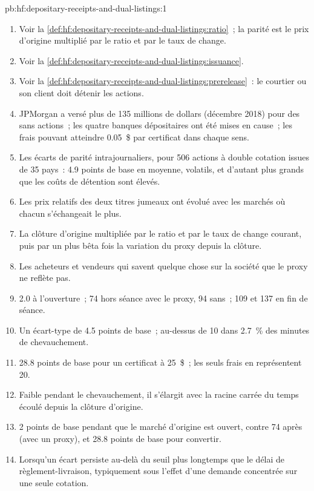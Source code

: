 \begin{solution}{pb:hf:depositary-receipts-and-dual-listings:1}
\begin{enumerate}
\item Voir la \cref{def:hf:depositary-receipts-and-dual-listings:ratio}~; la parité est le prix d'origine multiplié par le ratio et par le taux de change.
\item Voir la \cref{def:hf:depositary-receipts-and-dual-listings:issuance}.
\item Voir la \cref{def:hf:depositary-receipts-and-dual-listings:prerelease}~: le courtier ou son client doit détenir les actions.
\item JPMorgan a versé plus de 135 millions de dollars (décembre 2018) pour des  sans actions~; les quatre banques dépositaires ont été mises en cause~; les frais pouvant atteindre
0.05~\$ par certificat dans chaque sens.
\item Les écarts de parité intrajournaliers, pour 506 actions à double cotation issues de 35 pays~: 4.9 points de base en moyenne, volatils, et d'autant plus grands que les coûts de détention sont élevés.
\item Les prix relatifs des deux titres jumeaux ont évolué avec les marchés où chacun s'échangeait le plus.
\item La clôture d'origine multipliée par le ratio et par le taux de change courant, puis par un plus bêta fois la variation du proxy depuis la clôture.
\item Les acheteurs et vendeurs qui savent quelque chose sur la société que le proxy ne reflète pas.
\item 2.0 à l'ouverture~; 74 hors séance avec le proxy, 94 sans~; 109 et 137 en fin de séance.
\item Un écart-type de 4.5 points de base~; au-dessus de 10 dans 2.7~\% des minutes de chevauchement.
\item 28.8 points de base pour un certificat à 25~\$~; les seuls frais en représentent 20.
\item Faible pendant le chevauchement, il s'élargit avec la racine carrée du temps écoulé depuis la clôture d'origine.
\item 2 points de base pendant que le marché d'origine est ouvert, contre 74 après (avec un proxy), et 28.8 points de base pour convertir.
\item Lorsqu'un écart persiste au-delà du seuil plus longtemps que le délai de règlement-livraison, typiquement sous l'effet d'une demande concentrée sur une seule cotation.

\end{enumerate}
\end{solution}
